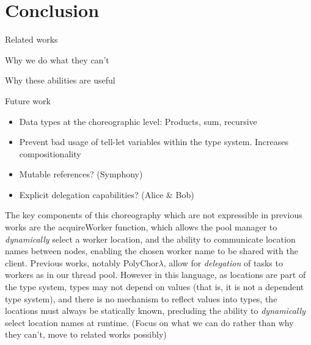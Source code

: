 \section{Conclusion}
\label{sec:conclusion}

\todo Related works

\todo Why we do what they can't

\todo Why these abilities are useful

\todo Future work
\begin{itemize}
	\item Data types at the choreographic level: Products, sum, recursive
	\item Prevent bad usage of tell-let variables within the type system. Increases compositionality
	\item Mutable references? (Symphony)
	\item Explicit delegation capabilities? (Alice \& Bob)
\end{itemize}

The key components of this choreography which are not expressible in previous works are the \textsf{acquireWorker} function, which allows the pool manager to \emph{dynamically} select a worker location, and the ability to communicate location names between nodes, enabling the chosen worker name to be shared with the client.
Previous works, notably PolyChor$\lambda$, allow for \emph{delegation} of tasks to workers as in our thread pool.
However in this language, as locations are part of the type system, types may not depend on values (that is, it is not a dependent type system), and there is no mechanism to reflect values into types, the locations must always be statically known, precluding the ability to \emph{dynamically} select location names at runtime.
(Focus on what we can do rather than why they can't, move to related works possibly)

